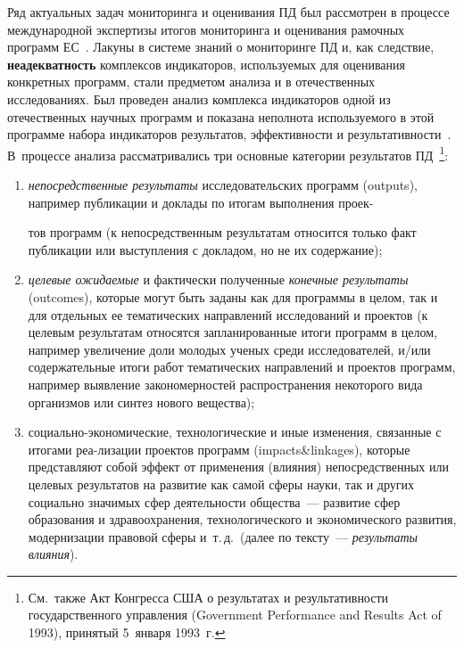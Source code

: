 \begin{multicols}{2}
Ряд актуальных задач мониторинга и оценивания ПД был рассмотрен в процессе международной экспертизы 
итогов мониторинга и оценивания рамочных программ ЕС~\cite{25-zat}. 
Лакуны в сис\-те\-ме знаний о мониторинге 
ПД и, как следствие, \textbf{неадекватность} комплексов индикаторов, ис\-поль\-зу\-емых 
для оценивания конкретных 
программ, стали предметом анализа и в отечественных исследованиях. 
Был проведен анализ комплекса 
индикаторов одной из отечественных научных программ и показана неполнота используемого в этой программе 
набора индикаторов результатов, эффективности и результативности~\cite{23-zat}. В~процессе анализа 
рассматривались три основные категории результатов ПД~\cite{22-zat, 24-zat, 25-zat}\footnote{См.\ также Акт 
Конгресса США о результатах и результативности государственного управления (Government 
Performance and Results Act of 1993), принятый 5~января 1993~г.}:
      \begin{enumerate}[(1)]
\item \textit{непосредственные результаты} исследовательских программ (outputs), 
например публикации и доклады по итогам выполнения проек-\linebreak\vspace*{-12pt}

\pagebreak

\noindent
тов программ (к 
непосредственным результатам относится только факт публикации или выступления с 
докладом, но не их содержание);
\item \textit{целевые ожидаемые} и фактически полученные \textit{конечные 
результаты} (outcomes), которые могут быть заданы как для программы в целом, так и 
для отдельных ее тематических на\-прав\-ле\-ний исследований и проектов (к целевым 
результатам относятся запланированные итоги программ в целом, например увеличение 
доли молодых ученых среди исследователей, и/или содержательные итоги работ 
тематических направлений и проектов программ, например выявление закономерностей 
распространения некоторого вида организмов или синтез нового вещества);
\item социально-экономические, технологические и иные изменения, связанные с 
итогами реа-\linebreak ли\-за\-ции проектов программ (impacts\&\linebreak linkages), которые представляют 
собой эффект от применения (влияния) непосредственных или целевых результатов на 
развитие как самой сферы науки, так и других социально значимых сфер деятельности 
общества~--- развитие сфер образования и здравоохранения, технологического и 
экономического развития, модернизации правовой сферы и~т.\,д.\ (далее по тексту~--- 
\textit{результаты влияния}).
\end{enumerate}
      

\end{multicols}
